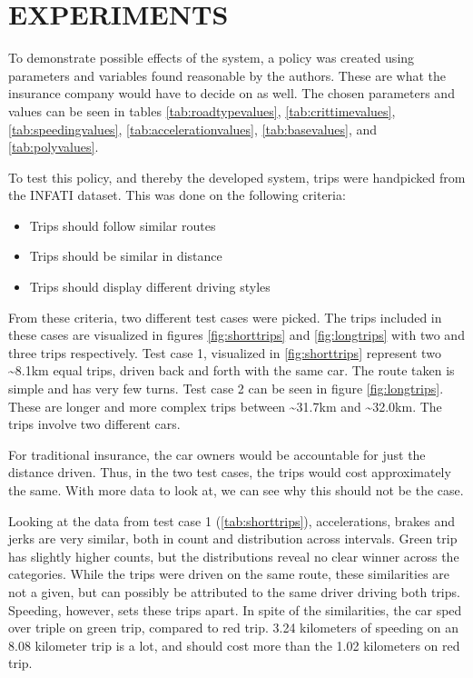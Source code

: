 \section{EXPERIMENTS}\label{sec:expe}
To demonstrate possible effects of the system, a policy was created using parameters and variables found reasonable by the authors. These are what the insurance company would have to decide on as well. The chosen parameters and values can be seen in tables \ref{tab:roadtypevalues}, \ref{tab:crittimevalues}, \ref{tab:speedingvalues}, \ref{tab:accelerationvalues}, \ref{tab:basevalues}, and \ref{tab:polyvalues}. 

To test this policy, and thereby the developed system, trips were handpicked from the INFATI dataset. This was done on the following criteria:

\begin{itemize}
  \item Trips should follow similar routes
  \item Trips should be similar in distance
  \item Trips should display different driving styles
\end{itemize}

From these criteria, two different test cases were picked. The trips included in these cases are visualized in figures \ref{fig:shorttrips} and \ref{fig:longtrips} with two and three trips respectively. 
Test case 1, visualized in \ref{fig:shorttrips} represent two \textasciitilde8.1km equal trips, driven back and forth with the same car. The route taken is simple and has very few turns.
Test case 2 can be seen in figure \ref{fig:longtrips}. These are longer and more complex trips between  \textasciitilde31.7km and \textasciitilde32.0km. The trips involve two different cars.

For traditional insurance, the car owners would be accountable for just the distance driven. Thus, in the two test cases, the trips would cost approximately the same. With more data to look at, we can see why this should not be the case.

Looking at the data from test case 1 (\ref{tab:shorttrips}), accelerations, brakes and jerks are very similar, both in count and distribution across intervals. Green trip has slightly higher counts, but the distributions reveal no clear winner across the categories. While the trips were driven on the same route, these similarities are not a given, but can possibly be attributed to the same driver driving both trips. Speeding, however, sets these trips apart. In spite of the similarities, the car sped over triple on green trip, compared to red trip. 3.24 kilometers of speeding on an 8.08 kilometer trip is a lot, and should cost more than the 1.02 kilometers on red trip.

